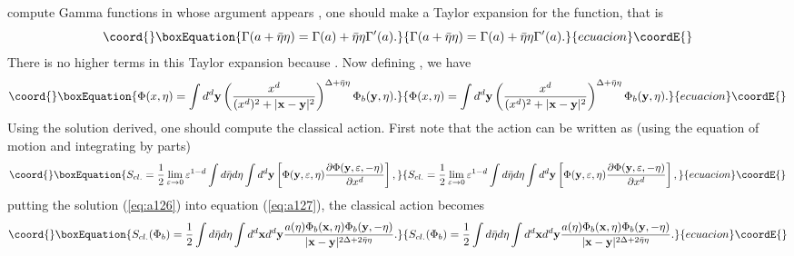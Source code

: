\documentclass[a4paper,11pt]{article}
\begin{document}
compute Gamma functions in whose argument appears
\myHighlight{$\bar{\eta}\eta$}\coordHE{}, one should make a Taylor expansion for the
function, that is
\begin{equation}\coord{}\boxEquation{\label{eq:a125}
\Gamma(a+\bar{\eta}\eta)=\Gamma(a)+\bar{\eta}\eta\Gamma^{\prime}(a).
}{\Gamma(a+\bar{\eta}\eta)=\Gamma(a)+\bar{\eta}\eta\Gamma^{\prime}(a).
}{ecuacion}\coordE{}\end{equation} There is no higher terms in this Taylor expansion
because \coordHE{}. Now defining
\coordHE{}, we have
\begin{equation}\coord{}\boxEquation{\label{eq:a126}
\Phi(x,\eta)=\int d^d \mathbf{y}
\left(\frac{x^d}{(x^d)^2+|\mathbf{x-y}|^2} \right)^
{\Delta+\bar{\eta}\eta} \Phi_b(\mathbf{y},\eta).
}{\Phi(x,\eta)=\int d^d \mathbf{y}
\left(\frac{x^d}{(x^d)^2+|\mathbf{x-y}|^2} \right)^
{\Delta+\bar{\eta}\eta} \Phi_b(\mathbf{y},\eta).
}{ecuacion}\coordE{}\end{equation}
Using the solution derived, one should compute the classical
action. First note that the action can be written as (using the
equation of motion and integrating by parts)
\begin{equation}\coord{}\boxEquation{  \label{eq:a127}
S_{cl.}=\frac{1}{2} \lim_{\varepsilon\rightarrow 0}
\varepsilon^{1-d} \int d \bar{\eta}d \eta \int d^d \mathbf{y}
\left[\Phi(\mathbf{y},\varepsilon,\eta) \frac{\partial
\Phi(\mathbf{y},\varepsilon,-\eta)}{\partial x^d}\right],
}{  S_{cl.}=\frac{1}{2} \lim_{\varepsilon\rightarrow 0}
\varepsilon^{1-d} \int d \bar{\eta}d \eta \int d^d \mathbf{y}
\left[\Phi(\mathbf{y},\varepsilon,\eta) \frac{\partial
\Phi(\mathbf{y},\varepsilon,-\eta)}{\partial x^d}\right],
}{ecuacion}\coordE{}\end{equation}
putting the solution (\ref{eq:a126}) into equation
(\ref{eq:a127}), the classical action becomes
\begin{equation}\coord{}\boxEquation{  \label{eq:a128}
S_{cl.}(\Phi_b)=\frac{1}{2}\int d \bar{\eta}d \eta \int d^d
\mathbf{x} d^d \mathbf{y} \frac{a(\eta)
\Phi_b(\mathbf{x},\eta)\Phi_b(\mathbf{y},-\eta)}{|
\mathbf{x-y}|^{2\Delta+2\bar{\eta}\eta}}.
}{  S_{cl.}(\Phi_b)=\frac{1}{2}\int d \bar{\eta}d \eta \int d^d
\mathbf{x} d^d \mathbf{y} \frac{a(\eta)
\Phi_b(\mathbf{x},\eta)\Phi_b(\mathbf{y},-\eta)}{|
\mathbf{x-y}|^{2\Delta+2\bar{\eta}\eta}}.
}{ecuacion}\coordE{}\end{equation}
\end{document}
